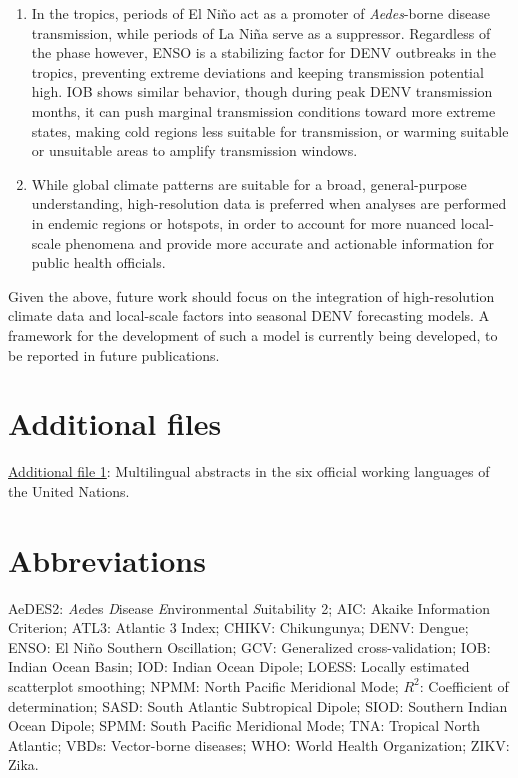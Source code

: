 \documentclass[10pt,twocolumn]{wlscirep}
\begin{document}
\begin{enumerate}
  \item In the tropics, periods of El Niño act as a promoter of \textit{Aedes}-borne disease transmission, while periods of La Niña serve as a suppressor. Regardless of the phase however, ENSO is a stabilizing factor for DENV outbreaks in the tropics, preventing extreme deviations and keeping transmission potential high. IOB shows similar behavior, though during peak DENV transmission months, it can push marginal transmission conditions toward more extreme states, making cold regions less suitable for transmission, or warming suitable or unsuitable areas to amplify transmission windows.
  \item While global climate patterns are suitable for a broad, general-purpose understanding, high-resolution data is preferred when analyses are performed in endemic regions or hotspots, in order to account for more nuanced local-scale phenomena and provide more accurate and actionable information for public health officials.
\end{enumerate}

\noindent Given the above, future work should focus on the integration of high-resolution climate data and local-scale factors into seasonal DENV forecasting models. A framework for the development of such a model is currently being developed, to be reported in future publications.

\section*{Additional files} \label{sec-additional-files}

\href{multilingual_abstracts.pdf}{Additional file 1}: Multilingual abstracts in the six official working languages of the United Nations.

\section*{Abbreviations} \label{sec-abbreviations}
AeDES2: \textit{Ae}des \textit{D}isease \textit{E}nvironmental \textit{S}uitability 2; AIC: Akaike Information Criterion; ATL3: Atlantic 3 Index; CHIKV: Chikungunya; DENV: Dengue; ENSO: El Niño Southern Oscillation; GCV: Generalized cross-validation; IOB: Indian Ocean Basin; IOD: Indian Ocean Dipole; LOESS: Locally estimated scatterplot smoothing; NPMM: North Pacific Meridional Mode; $R^2$: Coefficient of determination; SASD: South Atlantic Subtropical Dipole; SIOD: Southern Indian Ocean Dipole; SPMM: South Pacific Meridional Mode; TNA: Tropical North Atlantic; VBDs: Vector-borne diseases; WHO: World Health Organization; ZIKV: Zika.
\end{document}

